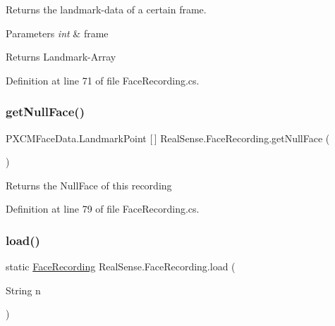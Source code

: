 Returns the landmark-\/data of a certain frame. 
\begin{DoxyParams}{Parameters}
{\em int} & frame \\
\hline
\end{DoxyParams}
\begin{DoxyReturn}{Returns}
Landmark-\/\+Array 
\end{DoxyReturn}


Definition at line 71 of file Face\+Recording.\+cs.

\mbox{\label{class_real_sense_1_1_face_recording_adb306111dec190d5852088978ea2459e}} 
\subsubsection{\texorpdfstring{get\+Null\+Face()}{getNullFace()}}
{\footnotesize\ttfamily P\+X\+C\+M\+Face\+Data.\+Landmark\+Point \mbox{[}$\,$\mbox{]} Real\+Sense.\+Face\+Recording.\+get\+Null\+Face (\begin{DoxyParamCaption}{ }\end{DoxyParamCaption})}

\begin{DoxyReturn}{Returns}
the Null\+Face of this recording 
\end{DoxyReturn}


Definition at line 79 of file Face\+Recording.\+cs.

\mbox{\label{class_real_sense_1_1_face_recording_a61d844c987701d6a21c0ce83333bdf14}} 
\subsubsection{\texorpdfstring{load()}{load()}}
{\footnotesize\ttfamily static \hyperlink{class_real_sense_1_1_face_recording}{Face\+Recording} Real\+Sense.\+Face\+Recording.\+load (\begin{DoxyParamCaption}\item[{String}]{n }\end{DoxyParamCaption})\hspace{0.3cm}{\ttfamily [static]}}

